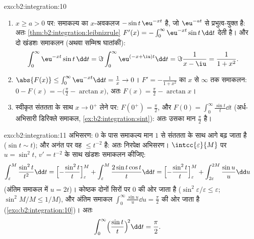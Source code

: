 \begin{solution}{exo:b2:integration:10}
\begin{enumerate}
  \item $x \geq a > 0$ पर: समाकल्य का $x$-अवकलज $-\sin t\,\eu^{-xt}$ है, जो $\eu^{-at}$ से प्रभुत्व-युक्त
        है: अतः \cref{thm:b2:integration:leibnizrule} $F'(x) =
        -\int_0^\infty \eu^{-xt}\sin t\,\dd t$ देती है। और दो खंडशः समाकलन (अथवा सम्मिश्र
        घातांकी):
        \[
        \int_0^\infty \eu^{-xt}\sin t\,\dd t
        = \Im \int_0^\infty \eu^{(-x+\iu)t}\dd t
        = \Im\frac{1}{x - \iu} = \frac{1}{1 + x^2} .
        \]
  \item $\abs{F(x)} \leq \int_0^\infty \eu^{-xt}\dd t = \frac1x \to
        0$। $F' = -\frac{1}{1+x^2}$ का $x$ से $\infty$ तक समाकलन: $0 - F(x) = -\bigl(\frac\pi2 - \arctan x\bigr)$, अतः $F(x) = \frac\pi2 - \arctan x$।
  \item स्वीकृत संततता के साथ $x \to 0^+$ लेने पर: $F(0^+) =
        \frac\pi2$, और $F(0) = \int_0^\infty \frac{\sin t}{t}\dd
        t$
        (अर्ध-अभिसारी डिरिक्ले समाकल, \cref{ex:b2:integration:sint}): अतः उसका मान $\frac\pi2$ है।
\end{enumerate}
\end{solution}

\begin{solution}{exo:b2:integration:11}
अभिसरण: $0$ के पास समाकल्य मान $1$ से संततता के साथ आगे बढ़ जाता है
($\sin t \sim t$); और अनंत पर वह $\leq t^{-2}$ है: अतः निरपेक्ष अभिसरण। $\intcc{\varepsilon}{M}$ पर $u = \sin^2 t$, $v' = t^{-2}$ के
साथ खंडशः समाकलन कीजिए:
\[
\int_\varepsilon^M \frac{\sin^2 t}{t^2}\dd t
= \Bigl[-\frac{\sin^2 t}{t}\Bigr]_\varepsilon^M
+ \int_\varepsilon^M \frac{2\sin t\cos t}{t}\dd t
= \Bigl[-\frac{\sin^2 t}{t}\Bigr]_\varepsilon^M
+ \int_{2\varepsilon}^{2M} \frac{\sin u}{u}\dd u
\]
(अंतिम समाकल में $u = 2t$)। कोष्ठक दोनों सिरों पर $0$ की ओर जाता है ($\sin^2\varepsilon/\varepsilon \leq \varepsilon$;
$\sin^2 M/M \leq 1/M$), और अंतिम समाकल $\int_0^\infty \frac{\sin u}{u}\dd u = \frac\pi2$ की ओर जाता है (\cref{exo:b2:integration:10})। अतः
\[
\int_0^\infty \Bigl(\frac{\sin t}{t}\Bigr)^{\!2}\dd t
= \frac\pi2 .
\]
\end{solution}

